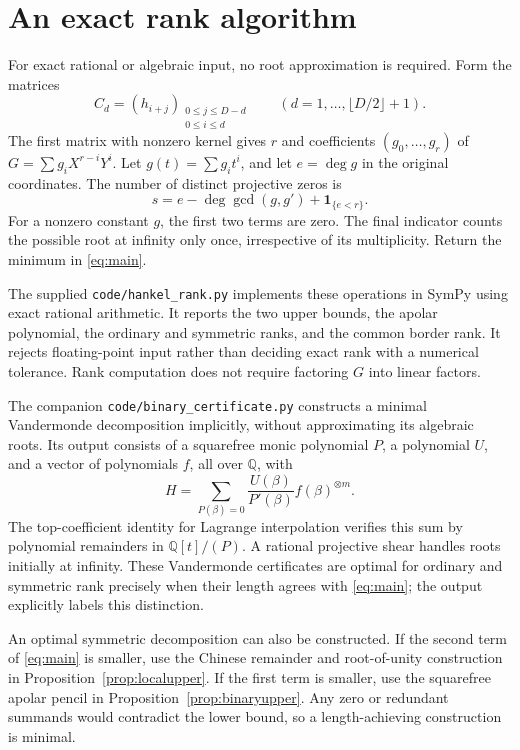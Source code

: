 \documentclass[11pt]{article}
\theoremstyle{definition}
\theoremstyle{remark}
\begin{document}
\section{An exact rank algorithm}\label{sec:algorithm}

For exact rational or algebraic input, no root approximation is required.
Form the matrices
\[
 C_d=(h_{i+j})_{\substack{0\le j\le D-d\\0\le i\le d}}
 \qquad(d=1,\ldots,\lfloor D/2\rfloor+1).
\]
The first matrix with nonzero kernel gives $r$ and coefficients
$(g_0,\ldots,g_r)$ of $G=\sum g_iX^{r-i}Y^i$.
Let $g(t)=\sum g_it^i$, and let $e=\deg g$ in the original coordinates.
The number of distinct projective zeros is
\begin{equation}\label{eq:gcdcount}
 s=e-\deg\gcd(g,g')+\mathbf1_{\{e<r\}}.
\end{equation}
For a nonzero constant $g$, the first two terms are zero.
The final indicator counts the possible root at infinity only once, irrespective
of its multiplicity. Return the minimum in \eqref{eq:main}.

The supplied \texttt{code/hankel\_rank.py} implements these operations in
SymPy using exact rational arithmetic. It reports the two upper bounds, the
apolar polynomial, the ordinary and symmetric ranks, and the common border
rank. It rejects floating-point input rather than deciding exact rank with a
numerical tolerance. Rank computation does not require factoring $G$ into
linear factors.

The companion \texttt{code/binary\_certificate.py} constructs a minimal
Vandermonde decomposition implicitly, without approximating its algebraic roots.
Its output consists of a squarefree monic polynomial $P$, a polynomial $U$,
and a vector of polynomials $f$, all over $\mathbb Q$, with
\[
 H=\sum_{P(\beta)=0}\frac{U(\beta)}{P'(\beta)}f(\beta)^{\otimes m}.
\]
The top-coefficient identity for Lagrange interpolation verifies this sum by
polynomial remainders in $\mathbb Q[t]/(P)$. A rational projective shear handles
roots initially at infinity. These Vandermonde certificates are optimal for
ordinary and symmetric rank precisely when their length agrees with
\eqref{eq:main}; the output explicitly labels this distinction.

An optimal symmetric decomposition can also be constructed. If the second
term of \eqref{eq:main} is smaller, use the Chinese remainder and root-of-unity
construction in Proposition~\ref{prop:localupper}. If the first term is smaller,
use the squarefree apolar pencil in Proposition~\ref{prop:binaryupper}.
Any zero or redundant summands would contradict the lower bound, so a
length-achieving construction is minimal.
\end{document}
